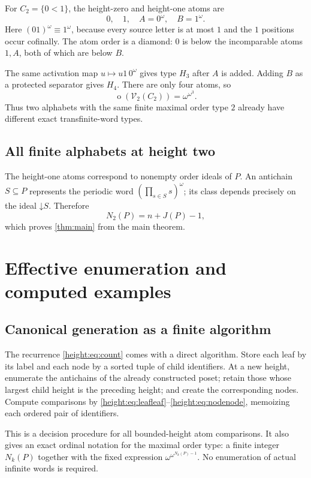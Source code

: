 \documentclass[11pt,a4paper]{article}
\numberwithin{equation}{section}
\theoremstyle{definition}
\theoremstyle{remark}
\newcommand{\mot}{\mathop{o}}
\newcommand{\down}{\mathord{\downarrow}}
\newcommand{\Vheight}{\mathcal V}
\begin{document}
For $C_2=\{0<1\}$, the height-zero and height-one atoms are
\[
  0,\quad1,\quad A=0^\omega,\quad B=1^\omega.
\]
Here $(01)^\omega\equiv1^\omega$, because every source letter is at most
$1$ and the $1$ positions occur cofinally. The atom order is a diamond:
$0$ is below the incomparable atoms $1,A$, both of which are below $B$.

The same activation map $u\mapsto u1\,0^\omega$ gives type $H_3$ after
$A$ is added. Adding $B$ as a protected separator gives $H_4$.
There are only four atoms, so
\[
  \mot(\Vheight_2(C_2))=\omega^{\omega^3}.
\]
Thus two alphabets with the same finite maximal order type $2$ already
have different exact transfinite-word types.

\subsection{All finite alphabets at height two}

The height-one atoms correspond to nonempty order ideals of $P$.
An antichain $S\subseteq P$ represents the periodic word
$(\prod_{s\in S}s)^\omega$; its class depends precisely on the ideal
$\down S$. Therefore
\[
  N_2(P)=n+J(P)-1,
\]
which proves \cref{thm:main} from the main theorem.

\section{Effective enumeration and computed examples}\label{height:sec:computations}

\subsection{Canonical generation as a finite algorithm}

The recurrence \eqref{height:eq:count} comes with a direct algorithm. Store each
leaf by its label and each node by a sorted tuple of child identifiers.
At a new height, enumerate the antichains of the already constructed
poset; retain those whose largest child height is the preceding height;
and create the corresponding nodes. Compute comparisons by
\eqref{height:eq:leafleaf}--\eqref{height:eq:nodenode}, memoizing each ordered pair of
identifiers.

This is a decision procedure for all bounded-height atom comparisons.
It also gives an exact ordinal notation for the maximal order type:
a finite integer $N_k(P)$ together with the fixed expression
$\omega^{\omega^{N_k(P)-1}}$. No enumeration of actual infinite words is
required.
\end{document}
